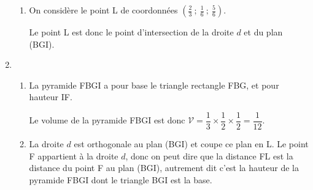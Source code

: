 \begin{enumerate}
\begin{enumerate}
\item On considère le point L de coordonnées $\left(\frac{2}{3}~;~\frac{1}{6}~;~\frac{5}{6}\right)$.



Le point L est donc le point d'intersection de la droite $d$ et du plan (BGI).
\end{enumerate}

\item %

\begin{enumerate}
\item La pyramide FBGI a pour base le triangle rectangle FBG, et pour hauteur IF.


Le volume de la pyramide FBGI est donc $\mathcal{V}=\dfrac{1}{3}\times \dfrac{1}{2}\times \dfrac{1}{2} =\dfrac{1}{12}$.

\item %
La droite $d$ est orthogonale au plan (BGI) et coupe ce plan en L. Le point F appartient à la droite $d$, donc on peut dire que la distance FL est la distance du point F au plan (BGI), autrement dit c'est la hauteur de la pyramide FBGI dont le triangle BGI est la base.


\end{enumerate}
\end{enumerate}

